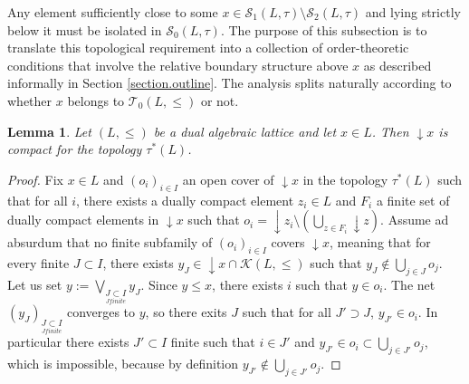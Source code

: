 \documentclass{article}
\newtheorem{lemma}[theorem]{Lemma}
\begin{document}

{
Any element sufficiently close to some \(x\in\mathcal S_1(L,\tau)\setminus\mathcal S_2(L,\tau)\) and lying strictly below it must be isolated in $\mathcal S_0(L,\tau)$. The purpose of this subsection is to translate this topological requirement into a collection of order-theoretic conditions that involve the relative boundary structure above \(x\) as described informally in Section \ref{section.outline}. 
The analysis splits naturally according to whether \(x\) belongs to \(\mathcal T_0(L,\leq)\) or not. 

}
\begin{lemma}
    {Let $(L,\le)$ be a dual algebraic lattice and let $x \in L$. Then $\mathop{\downarrow}x$ is compact for the topology $\tau^*(L)$.}
\end{lemma}

\begin{proof}
    Fix $x \in L$ and $(o_i)_{i \in I}$ an open cover of $\mathop{\downarrow}x$ in the topology $\tau^*(L)$ such that for all $i$, there exists a dually compact element $z_i \in L$ and $F_i$ a finite set of dually compact elements in $\mathop{\downarrow}x$ such that $o_i = \mathop{\downarrow}z_i \setminus \left(\bigcup_{z \in F_i} \mathop{\downarrow}z \right)$. Assume ad absurdum that no finite subfamily of $(o_i)_{i \in I}$ covers $\mathop{\downarrow}x$, meaning that for every finite $J \subset I$, there exists $y_J \in \mathop{\downarrow}x \cap \mathcal{K}(L,\le)$ such that $y_J \notin \bigcup_{j \in J} o_j$. Let us set $y := \bigvee_{\underset{J finite}{J \subset I}} y_J$. 
    Since $y \le x$, there exists $i$ such that $y \in o_i$. The net $(y_J)_{\underset{J finite}{J \subset I}}$ converges to $y$, so there exits $J$ such that for all $J' \supset J$, $y_{J'} \in o_i$. In particular there exists $J' \subset I$ finite such that $i \in J'$ and $y_{J'} \in o_i \subset \bigcup_{j \in J'} o_j$, which is impossible, because by definition $y_{J'} \notin \bigcup_{j \in J'} o_j$.
\end{proof}
\end{document}
